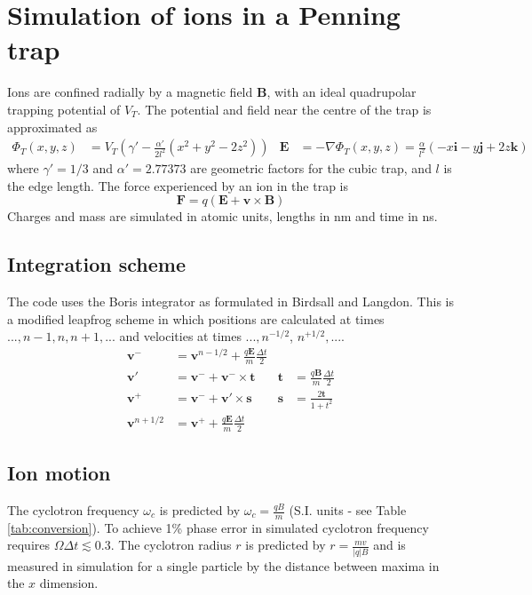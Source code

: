 \documentclass[10pt,conference,onecolumn]{IEEEtran}
\begin{document}
\section{Simulation of ions in a Penning trap}

Ions are confined radially by a magnetic field $\mathbf{B}$, with an ideal quadrupolar trapping potential of $V_T$.
The potential and field near the centre of the trap is approximated as 
\begin{align}
\Phi_T(x,y,z) &= V_T (\gamma' - \frac{\alpha'}{2l^2}(x^2 + y^2 - 2z^2)) &
\mathbf{E} &= - \nabla \Phi_T(x,y,z) = \frac{\alpha}{l^2}(-x\mathbf{i} -y\mathbf{j} +2z\mathbf{k})
\end{align}
where $\gamma' = 1/3$ and $\alpha' = 2.77373$ are geometric factors for the cubic trap, and $l$ is the edge length\cite{Guan1995}.
The force experienced by an ion in the trap is
\begin{equation}
\mathbf{F} = q(\mathbf{E} + \mathbf{v} \times \mathbf{B})
\end{equation}
Charges and mass are simulated in atomic units, lengths in nm and time in ns.



\subsection{Integration scheme}
The code uses the Boris integrator\cite{Boris1970} as formulated in Birdsall and Langdon\cite{Birdsall1985}.
This is a modified leapfrog scheme in which positions are calculated at times $..., n-1, n, n+1, ...$ and velocities at times $..., n^{-1/2}$, $n^{+1/2}, ...$.
\begin{align}
\mathbf{v}^- &= \mathbf{v}^{n-1/2} + \frac{q \mathbf{E}}{m} \frac{\Delta t}{2} \\
\mathbf{v}'  &= \mathbf{v}^- + \mathbf{v}^- \times \mathbf{t} & \mathbf{t}   &= \frac{q\mathbf{B}}{m} \frac{\Delta t}{2} \\
\mathbf{v}^+ &= \mathbf{v}^- + \mathbf{v}' \times \mathbf{s} & \mathbf{s}   &= \frac{2\mathbf{t}}{1 + t^2} \\
\mathbf{v}^{n+1/2} &= \mathbf{v}^+ + \frac{q \mathbf{E}}{m} \frac{\Delta t}{2}
\end{align}


\subsection{Ion motion}

The cyclotron frequency $\omega_c$ is predicted by $\omega_c = \frac{q B}{m}$\cite{Guan1995} (S.I. units - see Table \ref{tab:conversion}).  
To achieve 1\% phase error in simulated cyclotron frequency requires $\Omega \Delta t \lesssim 0.3$\cite{Birdsall1985,Patacchini2009}.
The cyclotron radius $r$ is predicted by $r = \frac{m v}{|q| B}$ and is measured in simulation for a single particle by the distance between maxima in the $x$ dimension.
\end{document}

